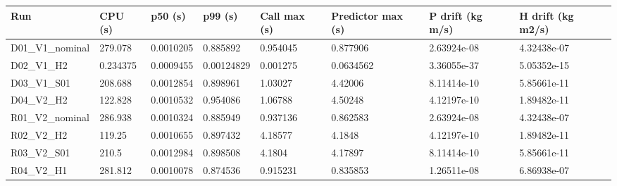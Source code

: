 \begin{tabular}{llllllll}
\hline
Run & CPU (s) & p50 (s) & p99 (s) & Call max (s) & Predictor max (s) & P drift (kg m/s) & H drift (kg m2/s) \\
\hline
D01\_V1\_nominal & 279.078 & 0.0010205 & 0.885892 & 0.954045 & 0.877906 & 2.63924e-08 & 4.32438e-07 \\
D02\_V1\_H2 & 0.234375 & 0.0009455 & 0.00124829 & 0.001275 & 0.0634562 & 3.36055e-37 & 5.05352e-15 \\
D03\_V1\_S01 & 208.688 & 0.0012854 & 0.898961 & 1.03027 & 4.42006 & 8.11414e-10 & 5.85661e-11 \\
D04\_V2\_H2 & 122.828 & 0.0010532 & 0.954086 & 1.06788 & 4.50248 & 4.12197e-10 & 1.89482e-11 \\
R01\_V2\_nominal & 286.938 & 0.0010324 & 0.885949 & 0.937136 & 0.862583 & 2.63924e-08 & 4.32438e-07 \\
R02\_V2\_H2 & 119.25 & 0.0010655 & 0.897432 & 4.18577 & 4.1848 & 4.12197e-10 & 1.89482e-11 \\
R03\_V2\_S01 & 210.5 & 0.0012984 & 0.898508 & 4.1804 & 4.17897 & 8.11414e-10 & 5.85661e-11 \\
R04\_V2\_H1 & 281.812 & 0.0010078 & 0.874536 & 0.915231 & 0.835853 & 1.26511e-08 & 6.86938e-07 \\
\hline
\end{tabular}
